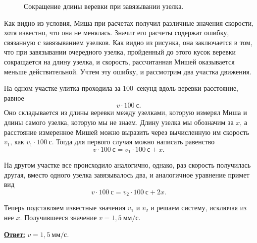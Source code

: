 \begin{figure}[h!]
	\centering
	\caption{Сокращение длины веревки при завязывании узелка.}
\end{figure}	

 	Как видно из условия, Миша при расчетах получил различные значения скорости, хотя известно, что она не менялась. Значит его расчеты содержат ошибку, связанную с завязыванием узелков. Как видно из рисунка, она заключается в том, что при завязывании очередного узелка, пройденный до этого кусок веревки сокращается на длину узелка, и скорость, рассчитанная Мишей оказывается меньше действительной. Учтем эту ошибку, и рассмотрим два участка движения.
 	
 	На одном участке улитка проходила за $100$~секунд вдоль веревки расстояние, равное 
\[
 	v \cdot 100~\text{с}.
\]
Оно складывается из длины веревки между узелками, которую измерял Миша и длины самого узелка, которую мы не знаем. Длину узелка мы обозначим за $x$, а расстояние измеренное Мишей можно выразить через вычисленную им скорость $v_1$, как $v_1 \cdot 100~\text{с}$. Тогда для первого случая можно написать равенство
\[
	v \cdot 100~\text{с} = v_1 \cdot 100~\text{с} + x.
\]  

	На другом участке все происходило аналогично, однако, раз скорость получилась другая, вместо одного узелка завязывалось два, и аналогичное уравнение примет вид
\[
	v \cdot 100~\text{с} = v_2 \cdot 100~\text{с} + 2x.
\]

	Теперь подставляем известные значения $v_1$ и $v_2$ и решаем систему, исключая из нее $x$. Получившееся значение $v = 1{,}5~\text{мм/с}$.
	
	\underline{\textbf{Ответ:}} $v = 1{,}5~\text{мм/с}$.